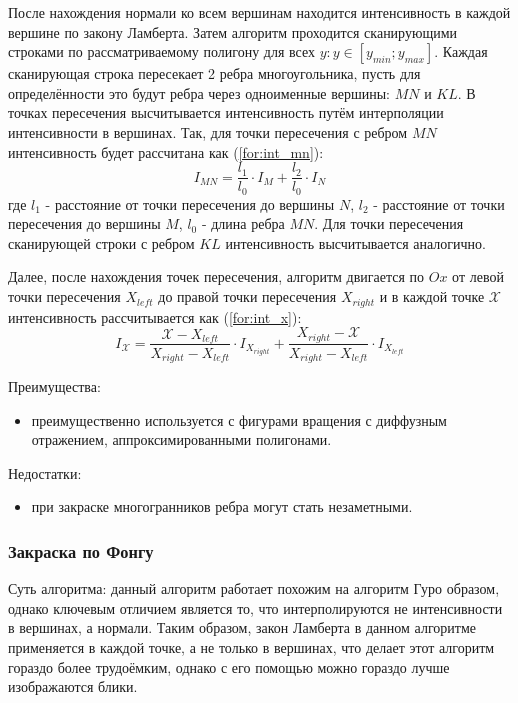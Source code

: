 После нахождения нормали ко всем вершинам находится интенсивность в каждой вершине по закону Ламберта.
Затем алгоритм проходится сканирующими строками по рассматриваемому полигону для всех $y: y \in [y_{min}; y_{max}]$. Каждая сканирующая строка пересекает 2 ребра многоугольника, пусть для определённости это будут ребра через одноименные вершины: $MN$ и $KL$. В точках пересечения высчитывается интенсивность путём интерполяции интенсивности в вершинах.
Так, для точки пересечения с ребром $MN$ интенсивность будет рассчитана как (\ref{for:int_mn}):
\begin{equation}
    \label{for:int_mn}
    I_{MN} = \frac{l_1}{l_0} \cdot I_M + \frac{l_2}{l_0} \cdot I_N
\end{equation}
где $l_1$ - расстояние от точки пересечения до вершины $N$, $l_2$ - расстояние от точки пересечения до вершины $M$, $l_0$ - длина ребра $MN$.
Для точки пересечения сканирующей строки с ребром $KL$ интенсивность высчитывается аналогично.

Далее, после нахождения точек пересечения, алгоритм двигается по $Ox$ от левой точки пересечения $X_{left}$ до правой точки пересечения $X_{right}$ и в каждой точке $\mathcal{X}$ интенсивность рассчитывается как (\ref{for:int_x}):
\begin{equation}
    \label{for:int_x}
    I_{\mathcal{X}} = \frac{\mathcal{X} - X_{left}}{X_{right} - X_{left}} \cdot I_{X_{right}} + \frac{X_{right} - \mathcal{X}}{X_{right} - X_{left}} \cdot I_{X_{left}}
\end{equation}

Преимущества:
\begin{itemize}
    \item преимущественно используется с фигурами вращения с диффузным отражением, аппроксимированными полигонами.
\end{itemize}

Недостатки:
\begin{itemize}
    \item при закраске многогранников ребра могут стать незаметными.
\end{itemize}

\subsubsection{Закраска по Фонгу}
Суть алгоритма: данный алгоритм работает похожим на алгоритм Гуро образом, однако ключевым отличием является то, что интерполируются не интенсивности в вершинах, а нормали\cite{lmodels}. Таким образом, закон Ламберта в данном алгоритме применяется в каждой точке, а не только в вершинах, что делает этот алгоритм гораздо более трудоёмким, однако с его помощью можно гораздо лучше изображаются блики.

